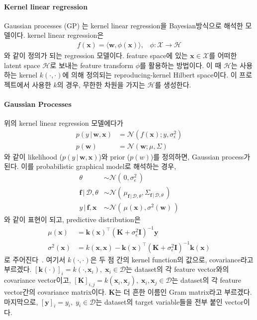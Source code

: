 \documentclass[ba, 11pt]{imsart}
\newcommand{\vf}{\mathbf{f}}
\newcommand{\vk}{\mathbf{k}}
\newcommand{\vw}{\mathbf{w}}
\newcommand{\vx}{\mathbf{x}}
\newcommand{\vy}{\mathbf{y}}
\newcommand{\mI}{\mathbf{I}}
\newcommand{\mK}{\mathbf{K}}
\begin{document}
\paragraph{Kernel linear regression}
Gaussian processes (GP) 는 kernel linear regression을 Bayesian방식으로 해석한 모델이다.
kernel linear regression은 
\begin{align}
  f(\vx) = \langle \vw, \phi(\vx) \rangle, \;\;\; \phi : \mathcal{X} \rightarrow \mathcal{H}
\end{align}
와 같이 정의가 되는 regression 모델이다.
feature space에 있는 \(\vx \in \mathcal{X}\)를 어떠한 latent space \(\mathcal{H}\)로 보내는 feature transform \(\phi\)를 활용하는 방법이다.
이 때 \(\mathcal{H}\)는 사용하는 kernel \(k(\cdot, \cdot)\)에 의해 정의되는 reproducing-kernel Hilbert space이다.
이 프로젝트에서 사용한 \(k\)의 경우, 무한한 차원을 가지는 \(\mathcal{H}\)를 생성한다.

\paragraph{Gaussian Processes}
위의 kernel linear regression 모델에다가
\begin{align}
  p(y \,|\, \vw, \vx) &= \mathcal{N}(f(\vx); y, \sigma^2_{\mathcal{\epsilon}}) \\
  p(\vw)              &= \mathcal{N}(\vw; \mu, \Sigma)
\end{align}
와 같이 likelihood (\(p(y \,|\, \vw, \vx)\))와 prior (\(p(w)\))를 정의하면, Gaussian process가 된다.
이를 probabilistic graphical model로 해석하는 경우, 
\begin{align}
  \theta                        &\sim \mathcal{N}(\,0, \sigma^2_{\epsilon}\,) \\
  \vf \,|\, \mathcal{D}, \theta &\sim \mathcal{N}(\, \mu_{\vf \,|\, \mathcal{D}, \theta}, \Sigma_{\vf \,|\, \mathcal{D}, \theta}\,) \\
  y   \,|\, \vf, \vx            &\sim \mathcal{N}(\, \mu(\vx), \sigma^2(\vw)\,)
\end{align}
와 같이 표현이 되고, predictive distribution은
\begin{align}
 \mu(\vx)      &= {\vk(\vx)}^{\top } {(\mK + \sigma^2_{\epsilon} \mI)}^{-1} \vy \label{eq:mu} \\
 \sigma^2(\vx) &= k(\vx, \vx) - {\vk(\vx)}^{\top}{(\mK + \sigma^2_{\epsilon} \mI)}^{-1} {\vk(\vx)} \label{eq:sigma}
\end{align}
로 주어진다~\cite{rasmussen_gaussian_2006}.
여기서 \(k(\cdot, \cdot)\)은 두 점 간의 kernel function의 값으로, covariance라고 부르겠다.
\({[\vk(\cdot)]}_i = {k(\cdot, \vx_i)}, \; {\vx_i \in \mathcal{D}}\)는 dataset의 각 feature vector와의 covariance vector이고,
\({[\mK]}_{i,j} = {k(\vx_i, \vx_j)}, \; {\vx_i, \vx_j \in \mathcal{D}}\)는 dataset의 각 feature vector간의 covariance matrix이다.
\(\mK\)는 더 흔한 이름인 Gram matrix라고 부르겠다.
마지막으로, \({[\vy]}_{i} = y_i, \; y_i \in \mathcal{D} \)는 dataset의 target variable들을 전부 붙인 vector이다.
\end{document}
